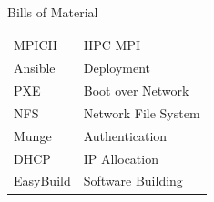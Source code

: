 \documentclass[final]{beamer}
\newlength{\sepwidth}
\newlength{\colwidth}
\newcommand{\separatorcolumn}{\begin{column}{\sepwidth}\end{column}}
\begin{document}
\begin{frame}[t]
\begin{columns}[t]
\begin{column}{\colwidth}
\begin{block}{Bills of Material}
\begin{table}
{\begin{tabular}{l|l}
								MPICH & HPC MPI \\
								Ansible & Deployment \\
								PXE & Boot over Network \\
								NFS & Network File System \\
								Munge & Authentication \\
								DHCP & IP Allocation \\
								EasyBuild & Software Building \\
							\end{tabular}
						}
					\end{table}
				\end{block}	
			\end{column}			
			\separatorcolumn
		\end{columns}
	\end{frame}
	
\end{document}
